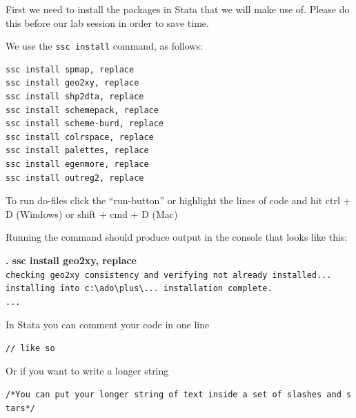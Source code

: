 \documentclass[
  letterpaper,
  DIV=11,
  numbers=noendperiod]{scrartcl}
\begin{document}
First we need to install the packages in Stata that we will make use of.
Please do this before our lab session in order to save time.

We use the \texttt{ssc\ install} command, as follows:

\begin{verbatim}
ssc install spmap, replace
ssc install geo2xy, replace
ssc install shp2dta, replace
ssc install schemepack, replace
ssc install scheme-burd, replace
ssc install colrspace, replace
ssc install palettes, replace
ssc install egenmore, replace
ssc install outreg2, replace
\end{verbatim}

\begin{tcolorbox}[enhanced jigsaw, breakable, arc=.35mm, coltitle=black, opacitybacktitle=0.6, colframe=quarto-callout-note-color-frame, rightrule=.15mm, colbacktitle=quarto-callout-note-color!10!white, toprule=.15mm, colback=white, toptitle=1mm, bottomtitle=1mm, titlerule=0mm, opacityback=0, left=2mm, leftrule=.75mm, title=\textcolor{quarto-callout-note-color}{\faInfo}\hspace{0.5em}{Note}, bottomrule=.15mm]

To run do-files click the ``run-button'' or highlight the lines of code
and hit ctrl + D (Windows) or shift + cmd + D (Mac)

\end{tcolorbox}

Running the command should produce output in the console that looks like
this:

\textbf{. ssc install geo2xy, replace}\\
\hspace*{0.333em}\hspace*{0.333em}\texttt{checking\ geo2xy\ consistency\ and\ verifying\ not\ already\ installed...}\\
\hspace*{0.333em}\hspace*{0.333em}\texttt{installing\ into\ c:\textbackslash{}ado\textbackslash{}plus\textbackslash{}...\ installation\ complete.}\\
\hspace*{0.333em}\hspace*{0.333em}\texttt{...}

\begin{tcolorbox}[enhanced jigsaw, breakable, arc=.35mm, coltitle=black, opacitybacktitle=0.6, colframe=quarto-callout-tip-color-frame, rightrule=.15mm, colbacktitle=quarto-callout-tip-color!10!white, toprule=.15mm, colback=white, toptitle=1mm, bottomtitle=1mm, titlerule=0mm, opacityback=0, left=2mm, leftrule=.75mm, title=\textcolor{quarto-callout-tip-color}{\faLightbulb}\hspace{0.5em}{always comment your code}, bottomrule=.15mm]

In Stata you can comment your code in one line

\texttt{//\ like\ so}

Or if you want to write a longer string

\texttt{/*You\ can\ put\ your\ longer\ string\ of\ text\ inside\ a\ set\ of\ slashes\ and\ stars*/}

\end{tcolorbox}
\end{document}

